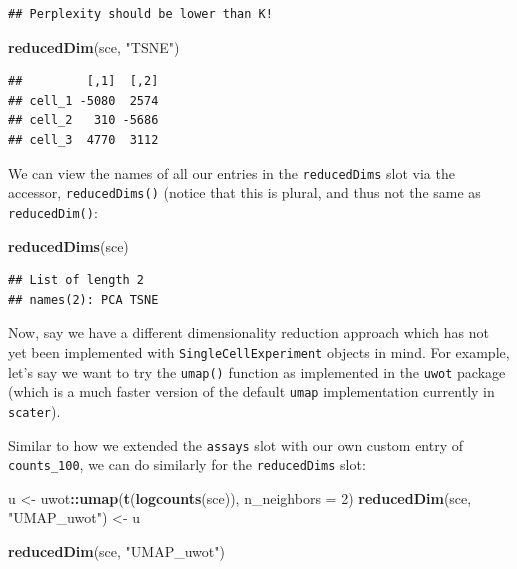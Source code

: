 \documentclass[]{book}
\newenvironment{Shaded}{\begin{snugshade}}{\end{snugshade}}
\newcommand{\DataTypeTok}[1]{\textcolor[rgb]{0.13,0.29,0.53}{#1}}
\newcommand{\DecValTok}[1]{\textcolor[rgb]{0.00,0.00,0.81}{#1}}
\newcommand{\KeywordTok}[1]{\textcolor[rgb]{0.13,0.29,0.53}{\textbf{#1}}}
\newcommand{\NormalTok}[1]{#1}
\newcommand{\OperatorTok}[1]{\textcolor[rgb]{0.81,0.36,0.00}{\textbf{#1}}}
\newcommand{\StringTok}[1]{\textcolor[rgb]{0.31,0.60,0.02}{#1}}
\begin{document}
\begin{verbatim}
## Perplexity should be lower than K!
\end{verbatim}

\begin{Shaded}
\begin{Highlighting}[]
\KeywordTok{reducedDim}\NormalTok{(sce, }\StringTok{"TSNE"}\NormalTok{)}
\end{Highlighting}
\end{Shaded}

\begin{verbatim}
##         [,1]  [,2]
## cell_1 -5080  2574
## cell_2   310 -5686
## cell_3  4770  3112
\end{verbatim}

We can view the names of all our entries in the \texttt{reducedDims} slot via the accessor, \texttt{reducedDims()} (notice that this is plural, and thus not the same as \texttt{reducedDim()}:

\begin{Shaded}
\begin{Highlighting}[]
\KeywordTok{reducedDims}\NormalTok{(sce)}
\end{Highlighting}
\end{Shaded}

\begin{verbatim}
## List of length 2
## names(2): PCA TSNE
\end{verbatim}

Now, say we have a different dimensionality reduction approach which has not yet been implemented with \texttt{SingleCellExperiment} objects in mind. For example, let's say we want to try the \texttt{umap()} function as implemented in the \texttt{uwot} package (which is a much faster version of the default \texttt{umap} implementation currently in \texttt{scater}).

Similar to how we extended the \texttt{assays} slot with our own custom entry of \texttt{counts\_100}, we can do similarly for the \texttt{reducedDims} slot:

\begin{Shaded}
\begin{Highlighting}[]
\NormalTok{u <-}\StringTok{ }\NormalTok{uwot}\OperatorTok{::}\KeywordTok{umap}\NormalTok{(}\KeywordTok{t}\NormalTok{(}\KeywordTok{logcounts}\NormalTok{(sce)), }\DataTypeTok{n_neighbors =} \DecValTok{2}\NormalTok{)}
\KeywordTok{reducedDim}\NormalTok{(sce, }\StringTok{"UMAP_uwot"}\NormalTok{) <-}\StringTok{ }\NormalTok{u}

\KeywordTok{reducedDim}\NormalTok{(sce, }\StringTok{"UMAP_uwot"}\NormalTok{)}
\end{Highlighting}
\end{Shaded}
\end{document}
